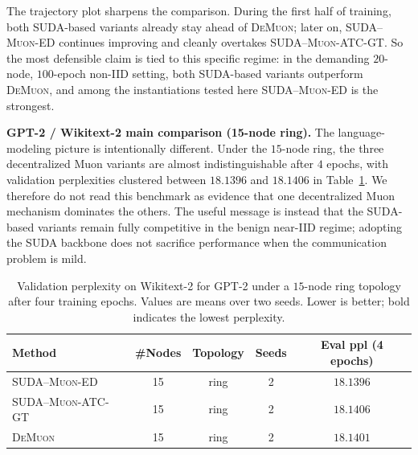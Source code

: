 \documentclass{article}
\begin{document}
The trajectory plot sharpens the comparison. During the first half of training,
both SUDA-based variants already stay ahead of \textsc{DeMuon}; later on,
\textsc{SUDA--Muon-ED} continues improving and cleanly overtakes
\textsc{SUDA--Muon-ATC-GT}. So the most defensible claim is tied to this specific regime: in the demanding $20$-node, $100$-epoch non-IID setting, both SUDA-based variants outperform \textsc{DeMuon}, and among the instantiations tested here \textsc{SUDA--Muon-ED} is the strongest.



\textbf{GPT-2 / Wikitext-2 main comparison (15-node ring).}
The language-modeling picture is intentionally different. Under the $15$-node
ring, the three decentralized Muon variants are almost indistinguishable after
$4$ epochs, with validation perplexities clustered between $18.1396$ and
$18.1406$ in Table~\ref{tab:gpt-main}. We therefore do not read this benchmark
as evidence that one decentralized Muon mechanism dominates the others. The
useful message is instead that the SUDA-based variants remain fully competitive
in the benign near-IID regime; adopting the SUDA backbone does not sacrifice
performance when the communication problem is mild.


\begin{table}[t!]
    \centering
    \caption{Validation perplexity on Wikitext-2 for GPT-2 under a $15$-node
    ring topology after four training epochs. Values are means over two seeds.
    Lower is better; bold indicates the lowest perplexity.}
    \label{tab:gpt-main}
    \begin{tabular}{lcccc}
        \toprule
        Method & \#Nodes & Topology & Seeds & Eval ppl (4 epochs) \\
        \midrule
        \textsc{SUDA--Muon-ED}     & 15 & ring & 2 & $\mathbf{18.1396}$ \\
        \textsc{SUDA--Muon-ATC-GT} & 15 & ring & 2 & $18.1406$ \\
        \textsc{DeMuon}            & 15 & ring & 2 & $18.1401$ \\
        \bottomrule
    \end{tabular}
\end{table}
\end{document}
